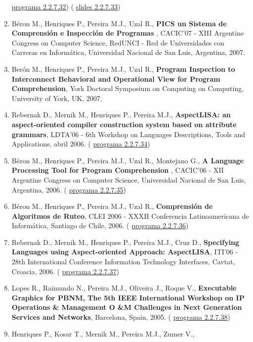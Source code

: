 \documentclass[11pt]{article}
\begin{document}
\begin{enumerate}
{\href{run:ComunicacoesOrais/programas/OpenCert2007.pdf}{programa 2.2.7.32}) (
\href{run:ComunicacoesOrais/OPENCERT07apres.pdf}{slides 2.2.7.33})}
\item{Béron M., Henriques P., Pereira M.J., Uzal R., {
\bf{ PICS un Sistema de Comprensión e Inspección de Programas}} , CACIC'07 - XIII Argentine Congress on Computer Science, RedUNCI - Red de Universidades con Carreras en Informática, Universidad Nacional de San Luis, Argentina, 2007.}
\item{Berón M., Henriques P., Pereira M.J., Uzal R., {
\bf{ Program Inspection to Interconnect Behavioral and Operational View for Program Comprehension}}, York Doctoral Symposium on Computing on Computing, University of York, UK, 2007.}
\item{Rebernak D., Mernik M., Henriques P., Pereira M.J., {
\bf{ AspectLISA: an aspect-oriented compiler construction system based on attribute grammars}}, LDTA'06 - 6th Workshop on Languages Descriptions, Tools and Applications, abril 2006. (
\href{run:ComunicacoesOrais/programas/LDTA2006prog.pdf}{programa 2.2.7.34})}
\item{Béron M., Henriques P., Pereira M.J., Uzal R., Montejano G., {
\bf{ A Language Processing Tool for Program Comprehension}} , CACIC'06 - XII Argentine Congress on Computer Science, Universidad Nacional de San Luis, Argentina, 2006. (
\href{run:ComunicacoesOrais/programas/Cacic2006prog.pdf}{programa 2.2.7.35})}
\item{Béron M., Henriques P., Pereira M.J., Uzal R., {
\bf{ Comprensión de Algoritmos de Ruteo}}, CLEI 2006 - XXXII Conferencia Latinoamericana de Informática, Santiago de Chile, 2006. (
\href{run:ComunicacoesOrais/programas/CLEI2006.pdf}{programa 2.2.7.36})}
\item{Rebernak D., Mernik M., Henriques P., Pereira M.J., Cruz D., {
\bf{ Specifying Languages using Aspect-oriented Approach: AspectLISA}}, ITI'06 - 28th International Conference Information Technology Interfaces, Cavtat, Croacia, 2006. (
\href{run:ComunicacoesOrais/programas/ITI2006presentation.pdf}{programa 2.2.7.37})}
\item{Lopes R., Raimundo N., Pereira M.J., Oliveira J., Roque V., {
\bf{ Executable Graphics for PBNM, The 5th IEEE International Workshop on IP Operations 
\& Management O
\&M Challenges in Next Generation Services and Networks}}, Barcelona, Spain, 2005. (
\href{run:ComunicacoesOrais/programas/IPOM05.pdf}{programa 2.2.7.38})}
\item{Henriques P., Kosar T., Mernik M., Pereira M.J., Zumer V., {
}}
\end{enumerate}
\end{document}
